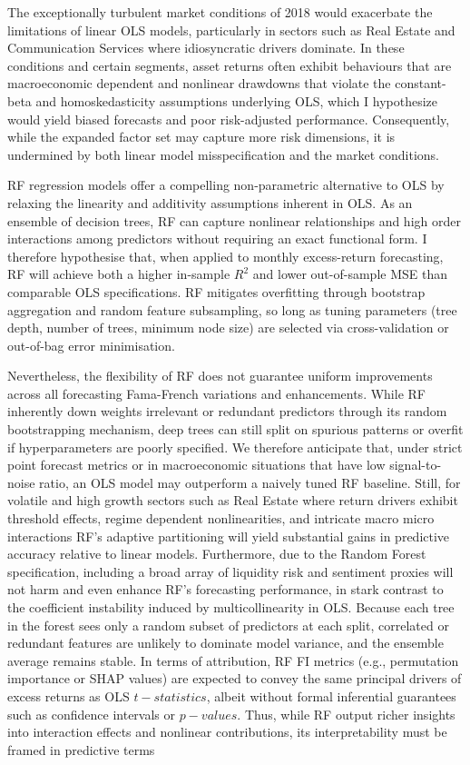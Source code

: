 The exceptionally turbulent market conditions of 2018 would exacerbate the limitations of linear OLS models, particularly in sectors such as Real Estate and Communication Services where idiosyncratic drivers dominate. In these conditions and certain segments, asset returns often exhibit behaviours that are macroeconomic dependent and nonlinear drawdowns that violate the constant-beta and homoskedasticity assumptions underlying OLS, which I hypothesize would yield biased forecasts and poor risk-adjusted performance. Consequently, while the expanded factor set may capture more risk dimensions, it is undermined by both linear model misspecification and the market conditions.

RF regression models offer a compelling non-parametric alternative to OLS by relaxing the linearity and additivity assumptions inherent in OLS. As an ensemble of decision trees, RF can capture nonlinear relationships and high order interactions among predictors without requiring an exact functional form. I therefore hypothesise that, when applied to monthly excess-return forecasting, RF will achieve both a higher in-sample $R^2$ and lower out-of-sample MSE than comparable OLS specifications. RF mitigates overfitting through bootstrap aggregation and random feature subsampling, so long as tuning parameters (tree depth, number of trees, minimum node size) are selected via cross-validation or out-of-bag error minimisation.

Nevertheless, the flexibility of RF does not guarantee uniform improvements across all forecasting Fama-French variations and enhancements. While RF inherently down weights irrelevant or redundant predictors through its random bootstrapping mechanism, deep trees can still split on spurious patterns or overfit if hyperparameters are poorly specified. We therefore anticipate that, under strict point forecast metrics or in macroeconomic situations that have low signal-to-noise ratio, an OLS model may outperform a naively tuned RF baseline. Still, for volatile and high growth sectors such as Real Estate where return drivers exhibit threshold effects, regime dependent nonlinearities, and intricate macro micro interactions RF's adaptive partitioning will yield substantial gains in predictive accuracy relative to linear models. Furthermore, due to the Random Forest specification, including a broad array of liquidity risk and sentiment proxies will not harm and even enhance RF's forecasting performance, in stark contrast to the coefficient instability induced by multicollinearity in OLS. Because each tree in the forest sees only a random subset of predictors at each split, correlated or redundant features are unlikely to dominate model variance, and the ensemble average remains stable. In terms of attribution, RF FI metrics (e.g., permutation importance or SHAP values) are expected to convey the same principal drivers of excess returns as OLS $t-statistics$, albeit without formal inferential guarantees such as confidence intervals or $p-values$. Thus, while RF output richer insights into interaction effects and nonlinear contributions, its interpretability must be framed in predictive terms

